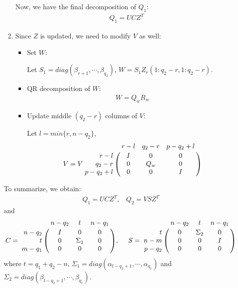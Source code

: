 \begin{enumerate}
\begin{enumerate}
                    Now, we have the final decomposition of $Q_1$:
                    \begin{align}
                        Q_1 = UCZ^{T}
                    \end{align}
                    \item Since $Z$ is updated, we need to modify $V$ as well:
                        \begin{itemize}
                            \item Set $W$:
                            
                                Let $S_1 = diag(\beta_{r+1}, \cdots, \beta_{q_2})$, $W = S_1Z_{r}(1:q_2-r,1:q_2-r)$.
                            \item QR decomposition of $W$:
                                \begin{align}
                                    W = Q_{w}R_{w}
                                \end{align}
                            \item Update middle $(q_2-r)$ columns of $V$:
                            
                                Let $l = min\{r, n-q_2\}$,
                                \begin{displaymath}
                                    V = V\bordermatrix{ & r-l & q_2-r & p-q_2+l \cr
                                    \hfill r-l & I & 0 & 0 \cr
                                    \hfill q_2-r & 0 & Q_{w} & 0 \cr
                                    \hfill p-q_2+l & 0 & 0 & I}
                                \end{displaymath}
                        \end{itemize}
            \end{enumerate}
            To summarize, we obtain:
            \begin{align}
                Q_1 = UCZ^{T}, \ \ \ \ Q_2 = VSZ^{T}
            \end{align}
            and
            \begin{displaymath}
                C = \bordermatrix{ & n-q_2 & t & n-q_1 \cr
                \hfill n-q_2 & I & 0 & 0 \cr
                \hfill t & 0 & \Sigma_1 & 0 \cr
                \hfill m-q_1 & 0 & 0 & 0}, \  \ \ \
                S = \bordermatrix{ & n-q_2 & t & n-q_1 \cr
                \hfill t & 0 & \Sigma_2 & 0 \cr
                \hfill n-m & 0 & 0 & I \cr
                \hfill p-q_2 & 0 & 0 & 0}
        \end{displaymath}
        where $t = q_1 + q_2 - n$, $\Sigma_1 = diag(\alpha_{l-q_2+1}, \cdots, \alpha_{q_1})$ and $\Sigma_2 = diag(\beta_{l-q_2+1}, \cdots, \beta_{q_1})$.
        

\end{enumerate}
